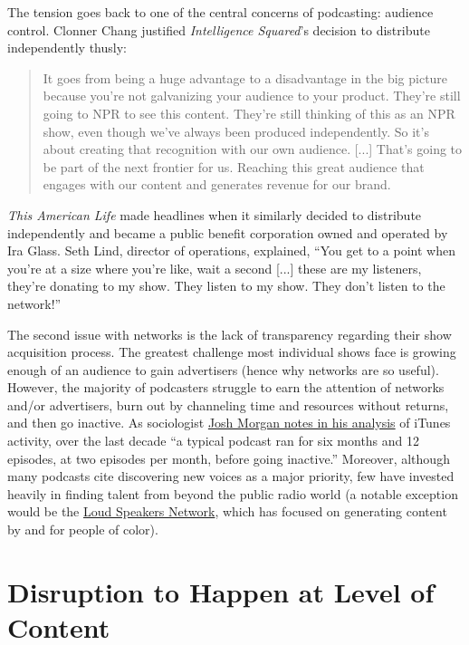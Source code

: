 \documentclass[notoc, symmetric, nobib, nols]{towcenter-guideto-book}
\begin{document}
The tension goes back to one of the central concerns of podcasting: audience control. Clonner Chang justified \textit{Intelligence Squared}'s decision to distribute independently thusly:

\begin{quote}
It goes from being a huge advantage to a disadvantage in the big picture because you're not galvanizing your audience to your product. They're still going to NPR to see this content. They're still thinking of this as an NPR show, even though we've always been produced independently. So it's about creating that recognition with our own audience. [...] That's going to be part of the next frontier for us. Reaching this great audience that engages with our content and generates revenue for our brand.\autocite{chang}
\end{quote}

\textit{This American Life} made headlines when it similarly decided to distribute independently and became a public benefit corporation owned and operated by Ira Glass. Seth Lind, director of operations, explained, ``You get to a point when you're at a size where you're like, wait a second [...] these are my listeners, they're donating to my show. They listen to my show. They don't listen to the network!''\autocite{lind}

The second issue with networks is the lack of transparency regarding their show acquisition process. The greatest challenge most individual shows face is growing enough of an audience to gain advertisers (hence why networks are so useful). However, the majority of podcasters struggle to earn the attention of networks and/or advertisers, burn out by channeling time and resources without returns, and then go inactive. As sociologist \href{https://medium.com/@slowerdawn/how-podcasts-have-changed-in-ten-years-by-the-numbers-720a6e984e4e}{Josh Morgan notes in his analysis} of iTunes activity, over the last decade ``a typical podcast ran for six months and 12 episodes, at two episodes per month, before going inactive.''\autocite{morgan} Moreover, although many podcasts cite discovering new voices as a major priority, few have invested heavily in finding talent from beyond the public radio world (a notable exception would be the \href{http://loudspeakersnetwork.com}{Loud Speakers Network}, which has focused on generating content by and for people of color).

\section{Disruption to Happen at Level of Content}
\end{document}
